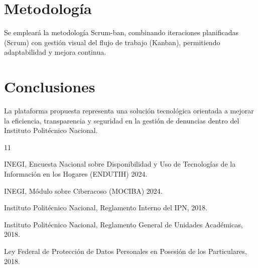 \documentclass[12pt,oneside]{report}
\begin{document}
\chapter{Metodología}

Se empleará la metodología Scrum-ban, combinando iteraciones planificadas (Scrum) con gestión visual del flujo de trabajo (Kanban), permitiendo adaptabilidad y mejora continua.

\chapter{Conclusiones}

La plataforma propuesta representa una solución tecnológica orientada a mejorar la eficiencia, transparencia y seguridad en la gestión de denuncias dentro del Instituto Politécnico Nacional.

\begin{thebibliography}{11}

INEGI, Encuesta Nacional sobre Disponibilidad y Uso de Tecnologías de la Información en los Hogares (ENDUTIH) 2024.

INEGI, Módulo sobre Ciberacoso (MOCIBA) 2024.

Instituto Politécnico Nacional, Reglamento Interno del IPN, 2018.

Instituto Politécnico Nacional, Reglamento General de Unidades Académicas, 2018.

Ley Federal de Protección de Datos Personales en Posesión de los Particulares, 2018.

\end{thebibliography}
\end{document}
